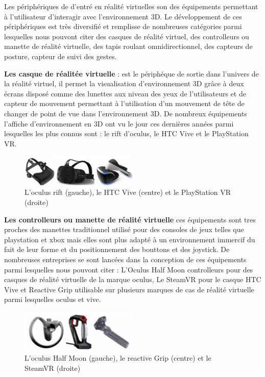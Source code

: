 Les périphériques de d'entré en réalité virtuelles son des équipements permettant à l'utilisateur d'interagir avec l'environnement 3D. 
Le développement de ces périphériques est très diversifié et remplisse de nombreuses catégories parmi lesquelles nous pouvont citer des casques de réalité virtuel, des controlleurs ou manette de réalité virtuelle, des tapis roulant omnidirectionnel, des capteurs de posture, capteur de suivi des gestes\cite{anthes2016state}.

\textbf{Les casque de réalitée virtuelle} : est le périphéque de sortie dans l'univers de la réalité virtuel, il permet la visualisation d'environnement 3D grâce à deux écrans disposé comme des lunettes aux niveau des yeux de l'utilisateurs et de capteur de mouvement permettant à l'utilisation d'un mouvement de tête de changer de point de vue dans l'environnement 3D.
De nombreux équipements l'affiche d'environnement en 3D ont vu le jour ces dernières années parmi lesquelles les plus connus sont : le rift d'oculus, le HTC Vive et le PlayStation VR.

\begin{figure}[H]
	\centering
	\includegraphics[width=0.5\textwidth]{img/3dcs}
	\caption{L'oculus rift (gauche), le HTC Vive (centre) et le PlayStation VR (droite) }
\end{figure}

\textbf{Les controlleurs ou manette de réalité virtuelle} ces équipements sont tres proches des manettes traditionnel utilisé pour des consoles de jeux telles que playstation et xbox mais elles sont plus adapté à un environnement immercif du fait de leur forme et du positionnement des bouttons et des joystick.
De nombreuses entreprises se sont lancées dans la conception de ces équipements parmi lesquelles nous pouvont citer : L'Oculus Half Moon controlleurs pour des casques de réalité virtuelle de la marque oculus, Le SteamVR pour le casque HTC Vive et Reactive Grip utilisable sur plusieurs marques de cas de réalité virtuelle parmi lesquelles oculus et vive.

\begin{figure}[H]
	\centering
	\includegraphics[width=0.5\textwidth]{img/3dcon}
	\caption{L'oculus Half Moon (gauche), le reactive Grip (centre) et le SteamVR (droite) }
\end{figure}

